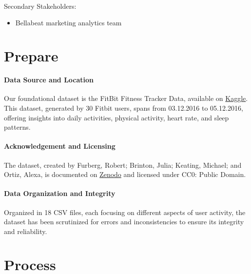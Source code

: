 \documentclass[
]{article}
\providecommand{\tightlist}{%
  \setlength{\itemsep}{0pt}\setlength{\parskip}{0pt}}
\begin{document}
Secondary Stakeholders:

\begin{itemize}
\tightlist
\item
  Bellabeat marketing analytics team
\end{itemize}

\hypertarget{prepare}{%
\section{Prepare}\label{prepare}}

\hypertarget{data-source-and-location}{%
\paragraph{Data Source and Location}\label{data-source-and-location}}

Our foundational dataset is the FitBit Fitness Tracker Data, available
on \href{https://www.kaggle.com/datasets/arashnic/fitbit}{Kaggle}. This
dataset, generated by 30 Fitbit users, spans from 03.12.2016 to
05.12.2016, offering insights into daily activities, physical activity,
heart rate, and sleep patterns.

\hypertarget{acknowledgement-and-licensing}{%
\paragraph{Acknowledgement and
Licensing}\label{acknowledgement-and-licensing}}

The dataset, created by Furberg, Robert; Brinton, Julia; Keating,
Michael; and Ortiz, Alexa, is documented on
\href{https://zenodo.org/record/53894\#.YMoUpnVKiP9}{Zenodo} and
licensed under CC0: Public Domain.

\hypertarget{data-organization-and-integrity}{%
\paragraph{Data Organization and
Integrity}\label{data-organization-and-integrity}}

Organized in 18 CSV files, each focusing on different aspects of user
activity, the dataset has been scrutinized for errors and
inconsistencies to ensure its integrity and reliability.

\hypertarget{process}{%
\section{Process}\label{process}}
\end{document}
